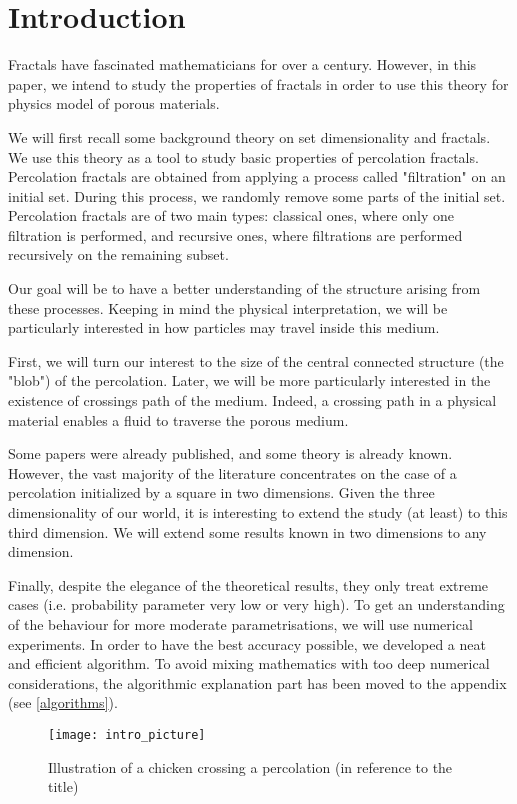 \setcounter{section}{-1}
\section{Introduction}

Fractals have fascinated mathematicians for over a century.
However, in this paper, we intend to study the properties of fractals in order to use this theory for physics model of porous materials.

We will first recall some background theory on set dimensionality and fractals.
We use this theory as a tool to study basic properties of percolation fractals.
Percolation fractals are obtained from applying a process called "filtration" on an initial set.
During this process, we randomly remove some parts of the initial set.
Percolation fractals are of two main types: classical ones, where only one filtration is performed, and recursive ones, where filtrations are performed recursively on the remaining subset.

Our goal will be to have a better understanding of the structure arising from these processes.
Keeping in mind the physical interpretation, we will be particularly interested in how particles may travel inside this medium.

First, we will turn our interest to the size of the central connected structure (the "blob") of the percolation.
Later, we will be more particularly interested in the existence of crossings path of the medium.
Indeed, a crossing path in a physical material enables a fluid to traverse the porous medium.

Some papers were already published, and some theory is already known.
However, the vast majority of the literature concentrates on the case of a percolation initialized by a square in two dimensions.
Given the three dimensionality of our world, it is interesting to extend the study (at least) to this third dimension.
We will extend some results known in two dimensions to any dimension.

Finally, despite the elegance of the theoretical results, they only treat extreme cases (i.e. probability parameter very low or very high).
To get an understanding of the behaviour for more moderate parametrisations, we will use numerical experiments.
In order to have the best accuracy possible, we developed a neat and efficient algorithm.
To avoid mixing mathematics with too deep numerical considerations, the algorithmic explanation part has been moved to the appendix (see \ref{algorithms}).

\begin{figure}[!h]
	\vspace{2cm}
	\texttt{[image: intro\_picture]}
	\centering
	\caption{Illustration of a chicken crossing a percolation (in reference to the title)}
	\label{fig:introRecursivePercolation}
\end{figure}
